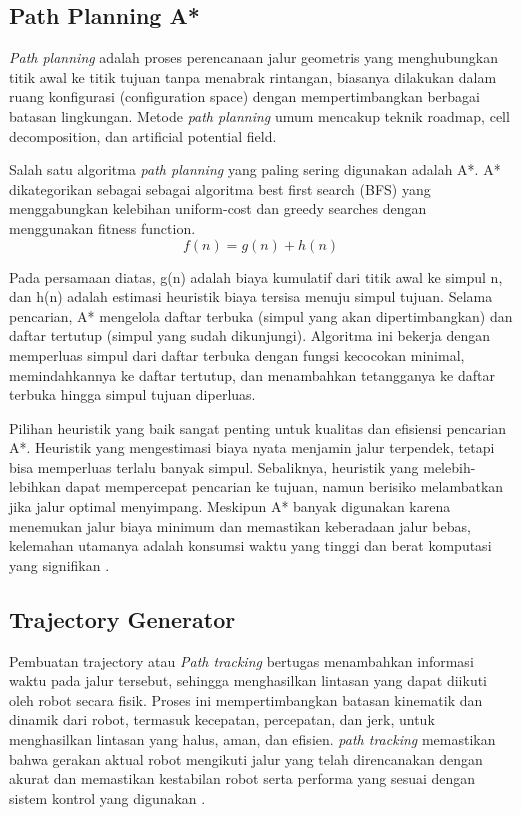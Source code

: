 \subsection{Path Planning A* }
\emph{Path planning} adalah proses perencanaan jalur geometris yang menghubungkan titik awal ke titik tujuan tanpa menabrak rintangan, biasanya dilakukan dalam ruang konfigurasi (configuration space) dengan mempertimbangkan berbagai batasan lingkungan. Metode \emph{path planning} umum mencakup teknik roadmap, cell decomposition, dan artificial potential field.
\par
Salah satu algoritma \emph{path planning} yang paling sering digunakan adalah A*. A* dikategorikan sebagai sebagai algoritma best first search (BFS) yang menggabungkan kelebihan uniform-cost dan greedy searches dengan menggunakan fitness function. 
\begin{equation}
    f(n) = g(n) + h(n)
\end{equation}
\par
Pada persamaan diatas, g(n) adalah biaya kumulatif dari titik awal ke simpul n, dan h(n) adalah estimasi heuristik biaya tersisa menuju simpul tujuan. Selama pencarian, A* mengelola daftar terbuka (simpul yang akan dipertimbangkan) dan daftar tertutup (simpul yang sudah dikunjungi). Algoritma ini bekerja dengan memperluas simpul dari daftar terbuka dengan fungsi kecocokan minimal, memindahkannya ke daftar tertutup, dan menambahkan tetangganya ke daftar terbuka hingga simpul tujuan diperluas.
\par
Pilihan heuristik yang baik sangat penting untuk kualitas dan efisiensi pencarian A*. Heuristik yang mengestimasi biaya nyata menjamin jalur terpendek, tetapi bisa memperluas terlalu banyak simpul. Sebaliknya, heuristik yang melebih-lebihkan dapat mempercepat pencarian ke tujuan, namun berisiko melambatkan jika jalur optimal menyimpang. Meskipun A* banyak digunakan karena menemukan jalur biaya minimum dan memastikan keberadaan jalur bebas, kelemahan utamanya adalah konsumsi waktu yang tinggi dan berat komputasi yang signifikan \parencite[]{damle2022dynamic}.

\subsection{Trajectory Generator}
Pembuatan trajectory atau \emph{Path tracking} bertugas menambahkan informasi waktu pada jalur tersebut, sehingga menghasilkan lintasan yang dapat diikuti oleh robot secara fisik. Proses ini mempertimbangkan batasan kinematik dan dinamik dari robot, termasuk kecepatan, percepatan, dan jerk, untuk menghasilkan lintasan yang halus, aman, dan efisien. \emph{path tracking} memastikan bahwa gerakan aktual robot mengikuti jalur yang telah direncanakan dengan akurat dan memastikan kestabilan robot serta performa yang sesuai dengan sistem kontrol yang digunakan \parencite[]{yao2020control}.

